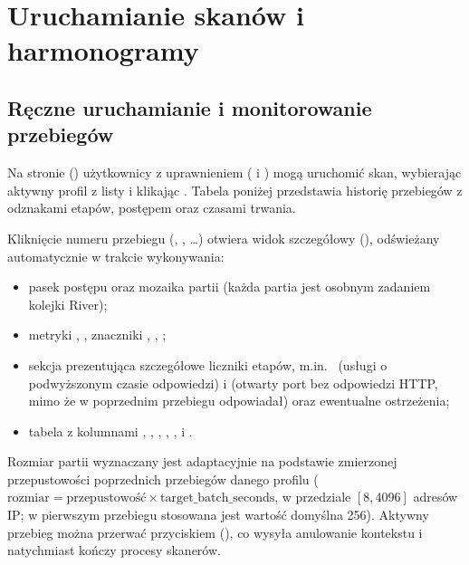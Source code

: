 \documentclass[10pt,a4paper]{article}
\begin{document}

\section{Uruchamianie skanów i harmonogramy}

\subsection{Ręczne uruchamianie i monitorowanie przebiegów}

Na stronie  () użytkownicy z uprawnieniem  ( i ) mogą uruchomić skan, wybierając aktywny profil z listy  i klikając . Tabela poniżej przedstawia historię przebiegów z odznakami etapów, postępem oraz czasami trwania.

Kliknięcie numeru przebiegu (, , \dots) otwiera widok szczegółowy  (), odświeżany automatycznie w trakcie wykonywania:
\begin{itemize}
  \item pasek postępu oraz mozaika partii (każda partia jest osobnym zadaniem kolejki River);
  \item metryki , , znaczniki , , ;
  \item sekcja  prezentująca szczegółowe liczniki etapów, m.in.\  (usługi o podwyższonym czasie odpowiedzi) i  (otwarty port bez odpowiedzi HTTP, mimo że w poprzednim przebiegu odpowiadał) oraz ewentualne ostrzeżenia;
  \item tabela  z kolumnami , , , , ,  i .
\end{itemize}

Rozmiar partii wyznaczany jest adaptacyjnie na podstawie zmierzonej przepustowości poprzednich przebiegów danego profilu ($\text{rozmiar} = \text{przepustowość} \times \text{target\_batch\_seconds}$, w przedziale $[8, 4096]$ adresów IP; w pierwszym przebiegu stosowana jest wartość domyślna 256). Aktywny przebieg można przerwać przyciskiem  (), co wysyła anulowanie kontekstu i natychmiast kończy procesy skanerów.
\end{document}
